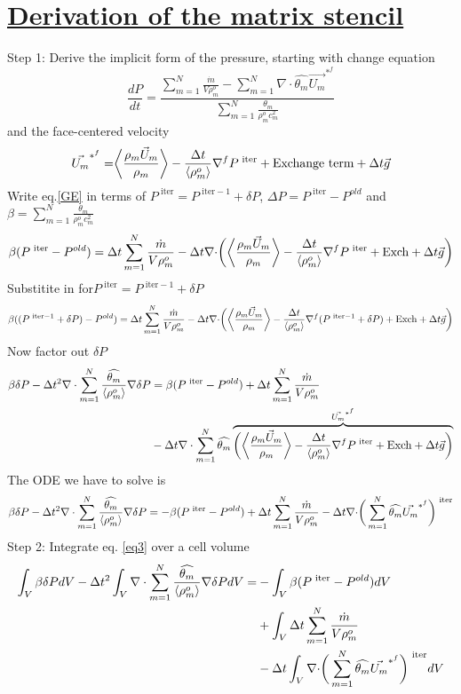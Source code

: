\documentclass[fleqn]{article}
\newcommand{\SUM}[1]    {\ensuremath{\sum \limits_{{#1}=1}^N }}
\newcommand{\B}[1]      {\biggr{#1}}
\newcommand{\U}         {{\vec{U}}}
\newcommand{\rhoM}      {\ensuremath{\rho^{o}_m}}
\newcommand{\rhoMFC}    {\ensuremath{\langle \rhoM \rangle}}
\newcommand{\delt}      {\ensuremath{\Delta{t}} }
\newcommand{\velFC}     {\ensuremath{\vec{U_m}^{*^{f}} } }
\newcommand{\thetaUW}   {\ensuremath{\widehat{\theta_m}} }
\newcommand{\iter}      {\ensuremath{\text{ iter}}}
\newcommand{\massSrc}   {\ensuremath{ \SUM{m}  \frac{\dot{m}} {V \rhoM} } }
\newcommand{\termA}     {\ensuremath { \B{\langle} \frac{ \rho_m \U_m }{\rho_m} \B{\rangle} } }
\newcommand{\termB}     {\ensuremath{ \frac{ \delt }{\rhoMFC} \nabla^{f} } }
\begin{document}
\section{\underline{Derivation of the matrix stencil \hspace{3in}}}  
Step 1: \hspace{0.25in} Derive the implicit form of the pressure, starting with
change equation
\begin{equation}
     \label{GE}\frac{dP}{dt} = 
     \frac{\massSrc -  \SUM{m} \nabla \cdot \thetaUW \velFC}
                      {\SUM{m} \frac{\theta_m}{\rhoM c_m^2} }
\end{equation}
%
and the face-centered velocity
\[
    \vec{U_m}^{*^{f}} 
    = \termA - \termB{P^{\iter}} + \text{Exchange term}   + \delt\vec{g}
\]
%
Write eq.{\ref{GE}} in terms of $P^{\iter} = P^{\iter -1 } + \delta{P}$, $\Delta{P} = P^{\iter} - P^{old}$ and 
 $\beta = \SUM{m} \frac{\theta_m}{\rhoM c_m^2}$
\begin{equation}
\label{eq2}
\beta (P^{\iter} -P^{old}) =
     \delt \massSrc 
  -  \delt \nabla \cdot \B{(} \termA -\termB{P^{\iter}} +\text{Exch} + \delt\vec{g} \B{)}
\end{equation}
Substitite in for$P^{\iter} = P^{\iter -1 } + \delta{P}$
\[
  \beta ((P^{\iter -1 } + \delta{P}) -P^{old}) =
    \delt \massSrc 
  - \delt \nabla \cdot \B{(} \termA -\termB{(P^{\iter -1 } + \delta{P})} 
  +\text{Exch} + \delt\vec{g} \B{)}
\]
Now factor out $\delta{P}$
\begin{align}
  \beta \delta{P} - 
  \delt^2 \nabla \cdot \SUM{m} \frac{\thetaUW}{\rhoMFC} \nabla \delta{P} \notag
  & = 
     \beta(P^{\iter} - P^{old} ) + \delt \massSrc \notag \\
  &- \delt \nabla \cdot \SUM{m} \thetaUW  \notag
  \overbrace {\B{(} \termA -\termB{P^{\iter}} +\text{Exch} + \delt\vec{g} \B{)} }^{\velFC} \notag
\end{align}
%
%
The ODE we have to solve is
\begin{equation}
\label{eq3}
  \beta \delta{P} - 
  \delt^2 \nabla \cdot \SUM{m} \frac{\thetaUW}{\rhoMFC} \nabla \delta{P}
  =
  -\beta(P^{\iter} - P^{old} )
  + \delt \massSrc
  -  \delt \nabla \cdot \B{(} \SUM{m} \thetaUW \velFC \B{)} ^{\iter}
\end{equation}
%
\newpage
Step 2: \hspace{0.25in} Integrate eq. {\ref{eq3}} over a cell volume
\begin{align}
  \int_{V} \beta \delta{P} dV 
  - \delt^2 \int_{V} \nabla \cdot \SUM{m} \frac{\thetaUW}{\rhoMFC} \nabla \delta{P} dV
  = 
  &- \int_{V} \beta(P^{\iter} - P^{old} ) dV \notag\\
  &+ \int_{V} \delt \massSrc \notag \\
  &- \delt \int_{V} \nabla \cdot \B{(} \SUM{m} \thetaUW \velFC \B{)} ^{\iter} dV \notag
\end{align}
\end{document}
